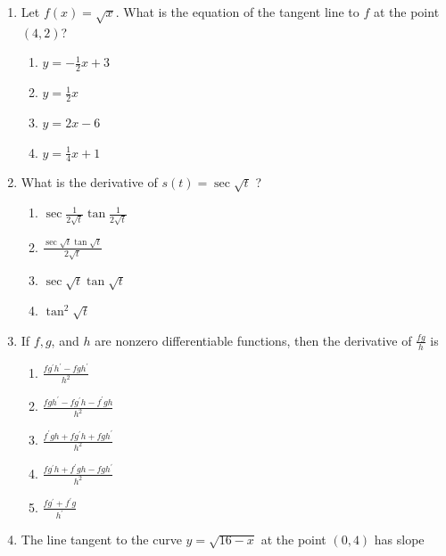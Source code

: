 \documentclass{article}
\begin{document}
\pagestyle{fancy}
\fancyhf{}
\renewcommand{\footrulewidth}{0.4pt}

\begin{enumerate}
	\itemsep2em
	\item
	\begin{minipage}[t]{\linewidth}
		Let \(f(x)=\sqrt{x}\). What is the equation of the tangent line to \(f\)
at the point \((4,2)\)?


		\vspace{1em}

		\begin{enumerate}
		\setlength\itemsep{2em}
			\item  $y=-\frac{1}{2} x+3$ 
			\item  $y=\frac{1}{2} x$ 
			\item  $y=2 x-6$ 
			\item  $y=\frac{1}{4} x+1$ 
		\end{enumerate}
	\end{minipage}
	\item
	\begin{minipage}[t]{\linewidth}
		What is the derivative of \(s(t)=\sec \sqrt{t}\) ?


		\vspace{1em}

		\begin{enumerate}
		\setlength\itemsep{2em}
			\item  $\sec \frac{1}{2 \sqrt{t}} \tan \frac{1}{2 \sqrt{t}}$ 
			\item  $\frac{\sec \sqrt{t} \tan \sqrt{t}}{2 \sqrt{t}}$ 
			\item  $\sec \sqrt{t} \tan \sqrt{t}$ 
			\item  $\tan ^{2} \sqrt{t}$ 
		\end{enumerate}
	\end{minipage}
	\item
	\begin{minipage}[t]{\linewidth}
		If \(f, g\), and \(h\) are nonzero differentiable functions, then the
derivative of \(\frac{f g}{h}\) is


		\vspace{1em}

		\begin{enumerate}
		\setlength\itemsep{2em}
			\item  $\frac{f g^{\prime} h^{\prime}-f g h^{\prime}}{h^{2}}$ 
			\item  $\frac{f g h^{\prime}-f g^{\prime} h-f^{\prime} g h}{h^{2}}$ 
			\item  $\frac{f^{\prime} g h+f g^{\prime} h+f g h^{\prime}}{h^{2}}$ 
			\item  $\frac{f g^{\prime} h+f^{\prime} g h-f g h^{\prime}}{h^{2}}$ 
			\item  $\frac{f g^{\prime}+f^{\prime} g}{h^{\prime}}$ 
		\end{enumerate}
	\end{minipage}
	\item
	\begin{minipage}[t]{\linewidth}
		The line tangent to the curve \(y=\sqrt{16-x}\) at the point \((0,4)\)
has slope



\end{minipage}
\end{enumerate}
\end{document}
